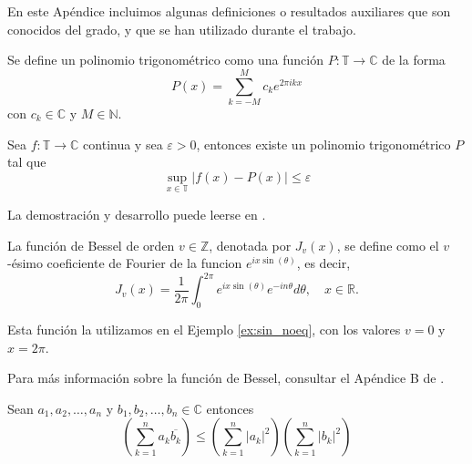 


En este Apéndice incluimos
algunas definiciones o resultados auxiliares que son conocidos del grado, y que se han utilizado durante el trabajo. 

\begin{definition}
    Se define un polinomio trigonométrico como una función $P:\mathbb{T} \to \mathbb{C}$ de la forma
    \[
        P(x) = \sum_{k=-M}^M c_k e^{2\pi i k x}
    \]
    con $c_k \in \mathbb{C}$ y $M \in \mathbb{N}$.
\end{definition}

\begin{theorem}
    \label{ap:weierstrass}
    Sea $f: \mathbb{T} \to \mathbb{C}$ continua y sea $\varepsilon>0$, entonces
    existe un polinomio trigonométrico $P$ tal que
    \[
        \sup_{x\in \mathbb{T}} \left|f(x)-P(x)\right| \leq \varepsilon
    \]
\end{theorem}

La demostración y desarrollo puede leerse en \cite{korner-2022}.

\begin{definition}
    \label{ap:bessel}
    La función de Bessel de orden $v \in \mathbb{Z}$, denotada por $J_v(x)$, se
    define como el $v$-ésimo coeficiente de Fourier de la funcion $e^{ix\sin(\theta)}$, es decir,
    \[
        J_v(x) = \frac{1}{2\pi} \int_{0}^{2\pi} e^{ix\sin(\theta)} e^{-in\theta} d\theta, \quad x\in\mathbb{R}.
    \]
\end{definition}
Esta función la utilizamos en el Ejemplo \ref{ex:sin_noeq}, con los valores $v=0$ y $x=2\pi$.

Para más información sobre la función de Bessel, consultar el Apéndice B de \cite{grafakos-2014}.

\begin{theorem}
    \label{ap:cauchy-schwarz}
    Sean $a_1, a_2, \ldots, a_n$ y $b_1, b_2, \ldots, b_n \in \mathbb{C}$ entonces
    \[
        \left(\sum_{k=1}^n a_k\overline{b_k}\right) \leq \left(\sum_{k=1}^n |a_k|^2\right) \left(\sum_{k=1}^n |b_k|^2\right)
    \]
\end{theorem}

